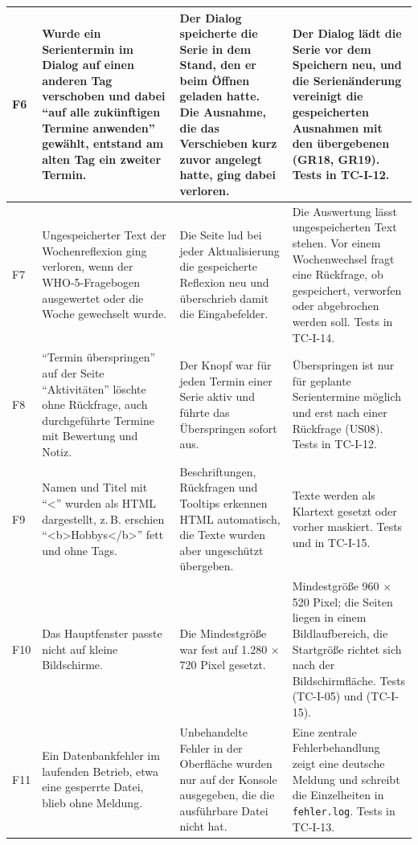 \begin{longtable}{@{}L{0.7cm}L{4.4cm}L{4.6cm}L{6.0cm}@{}}
  \midrule
  F6 & Wurde ein Serientermin im Dialog auf einen anderen Tag verschoben und dabei \enquote{auf alle zukünftigen Termine anwenden} gewählt, entstand am alten Tag ein zweiter Termin. & Der Dialog speicherte die Serie in dem Stand, den er beim Öffnen geladen hatte. Die Ausnahme, die das Verschieben kurz zuvor angelegt hatte, ging dabei verloren. & Der Dialog lädt die Serie vor dem Speichern neu, und die Serienänderung vereinigt die gespeicherten Ausnahmen mit den übergebenen (GR18, GR19). Tests in TC-I-12. \\
  \midrule
  F7 & Ungespeicherter Text der Wochenreflexion ging verloren, wenn der WHO-5-Fragebogen ausgewertet oder die Woche gewechselt wurde. & Die Seite lud bei jeder Aktualisierung die gespeicherte Reflexion neu und überschrieb damit die Eingabefelder. & Die Auswertung lässt ungespeicherten Text stehen. Vor einem Wochenwechsel fragt eine Rückfrage, ob gespeichert, verworfen oder abgebrochen werden soll. Tests  in TC-I-14. \\
  \midrule
  F8 & \enquote{Termin überspringen} auf der Seite \enquote{Aktivitäten} löschte ohne Rückfrage, auch durchgeführte Termine mit Bewertung und Notiz. & Der Knopf war für jeden Termin einer Serie aktiv und führte das Überspringen sofort aus. & Überspringen ist nur für geplante Serientermine möglich und erst nach einer Rückfrage (US08). Tests in TC-I-12. \\
  \midrule
  F9 & Namen und Titel mit \enquote{<} wurden als HTML dargestellt, z.\,B. erschien \enquote{<b>Hobbys</b>} fett und ohne Tags. & Beschriftungen, Rückfragen und Tooltips erkennen HTML automatisch, die Texte wurden aber ungeschützt übergeben. & Texte werden als Klartext gesetzt oder vorher maskiert. Tests  und  in TC-I-15. \\
  \midrule
  F10 & Das Hauptfenster passte nicht auf kleine Bildschirme. & Die Mindestgröße war fest auf 1.280 $\times$ 720 Pixel gesetzt. & Mindestgröße 960 $\times$ 520 Pixel; die Seiten liegen in einem Bildlaufbereich, die Startgröße richtet sich nach der Bildschirmfläche. Tests  (TC-I-05) und  (TC-I-15). \\
  \midrule
  F11 & Ein Datenbankfehler im laufenden Betrieb, etwa eine gesperrte Datei, blieb ohne Meldung. & Unbehandelte Fehler in der Oberfläche wurden nur auf der Konsole ausgegeben, die die ausführbare Datei nicht hat. & Eine zentrale Fehlerbehandlung zeigt eine deutsche Meldung und schreibt die Einzelheiten in \texttt{fehler.log}. Tests  in TC-I-13. \\

\end{longtable}

